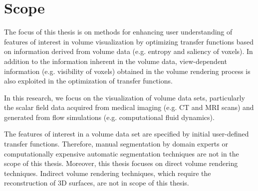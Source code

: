 
\section{Scope}

The focus of this thesis is on methods for enhancing user understanding of features of interest in volume visualization by optimizing transfer functions based on information derived from volume data (e.g. entropy and saliency of voxels). In addition to the information inherent in the volume data, view-dependent information (e.g. visibility of voxels) obtained in the volume rendering process is also exploited in the optimization of transfer functions.

In this research, we focus on the visualization of volume data sets, particularly the scalar field data acquired from medical imaging (e.g. CT and MRI scans) and generated from flow simulations (e.g. computational fluid dynamics).

The features of interest in a volume data set are specified by initial user-defined transfer functions.
Therefore, manual segmentation by domain experts or computationally expensive automatic segmentation techniques are not in the scope of this thesis.
Moreover, this thesis focuses on direct volume rendering techniques. Indirect volume rendering techniques, which require the reconstruction of 3D surfaces, are not in scope of this thesis.


